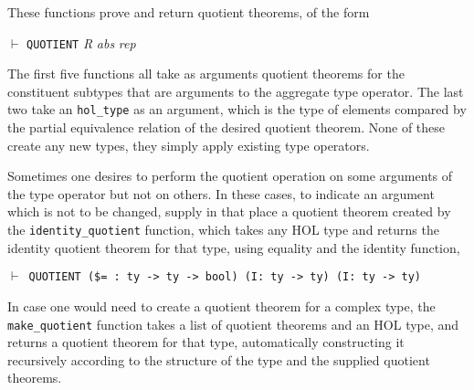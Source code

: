 \documentclass[envcountsame,runningheads]{llncs}
\newcommand{\quotient}{partial equivalence}
\begin{document}
These functions prove and return quotient theorems,
of the form
\begin{center}
$\vdash$ {\tt QUOTIENT} {\it R\/} {\it abs\/} {\it rep}
\end{center}
%
The first five functions all take as arguments quotient theorems
for the constituent subtypes that are arguments
to the aggregate type operator.  The last two take an {\tt hol\_type} as
an argument, which is the type of elements compared by the \quotient{} relation
of the desired quotient theorem.
None of these create any new types,
they simply apply existing type operators.

Sometimes one desires to perform the quotient operation on some
arguments of the type operator but not on others. In these
cases, to indicate an argument which is not to be changed,
supply in that place
a quotient theorem
created by the
{\tt identity\_quotient} function, which takes any HOL type and 
returns the identity quotient theorem for that type,
using equality and the identity function,

\begin{center}
{\tt $\vdash$ QUOTIENT (\$= : ty -> ty -> bool) (I: ty -> ty) (I: ty -> ty)}
\end{center}

In case one would need to create a quotient theorem for a complex type,
the {\tt make\_quotient} function takes a list of
quotient theorems and an HOL type, and returns a quotient theorem for
that type, automatically constructing it recursively
according to the structure of the type
and the supplied quotient theorems.
\begin{comment}
\end{comment}

\end{document}
